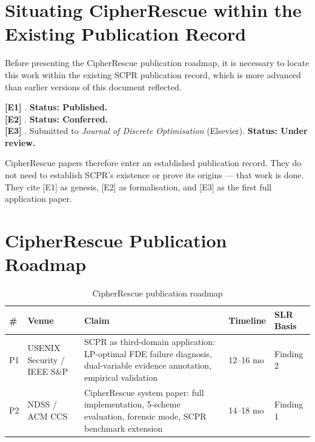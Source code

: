 \documentclass[11pt,a4paper]{report}
\begin{document}
\section{Situating CipherRescue within the Existing Publication Record}

Before presenting the CipherRescue publication roadmap, it is necessary to locate this work within the existing SCPR publication record, which is more advanced than earlier versions of this document reflected.

\begin{tcolorbox}[enhanced, colback=lightteal!30, colframe=tealgreen, arc=4pt, fonttitle=\bfseries,
  title={Existing SCPR Publications (Prior to CipherRescue Papers)}]
\textbf{[E1]} \citet{sadeghimanesh2022smt}. \textbf{Status: Published.}\\[6pt]
\textbf{[E2]} \citet{babatunde2025thesis}. \textbf{Status: Conferred.}\\[6pt]
\textbf{[E3]} \citet{babatunde2026arxiv}. Submitted to \textit{Journal of Discrete Optimisation} (Elsevier). \textbf{Status: Under review.}
\end{tcolorbox}

CipherRescue papers therefore enter an established publication record. They do not need to establish SCPR's existence or prove its origins --- that work is done. They cite [E1] as genesis, [E2] as formalisation, and [E3] as the first full application paper.

\section{CipherRescue Publication Roadmap}

\begin{table}[htbp]
\centering
\caption{CipherRescue publication roadmap}
\label{tab:pubroad}
\begin{tabular}{@{}llp{4.5cm}lp{3cm}@{}}
\toprule
\textbf{\#} & \textbf{Venue} & \textbf{Claim} & \textbf{Timeline} & \textbf{SLR Basis} \\
\midrule
P1 & USENIX Security / IEEE S\&P & SCPR as third-domain application: LP-optimal FDE failure diagnosis, dual-variable evidence annotation, empirical validation & 12--16 mo & Finding 2 \\
P2 & NDSS / ACM CCS & CipherRescue system paper: full implementation, 5-scheme evaluation, forensic mode, SCPR benchmark extension & 14--18 mo & Finding 1 \\
\bottomrule
\end{tabular}
\end{table}
\end{document}
